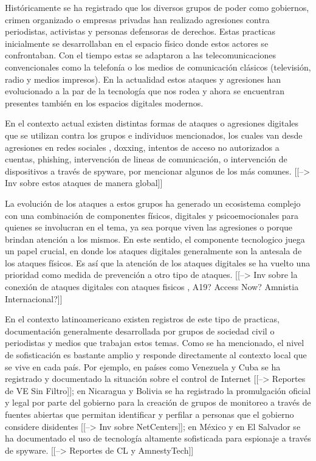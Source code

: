 \documentclass[12pt]{caltech_thesis}
\begin{document}
Históricamente se ha registrado que los diversos grupos de poder como gobiernos, crimen organizado o empresas privadas han realizado agresiones contra periodistas, activistas y personas defensoras de derechos. Estas practicas inicialmente se desarrollaban en el espacio físico donde estos actores se confrontaban. Con el tiempo estas se adaptaron a las telecomunicaciones convencionales como la telefonía o los medios de comunicación clásicos (televisión, radio y medios impresos). En la actualidad estos ataques y agresiones han evolucionado a la par de la tecnología que nos rodea y ahora se encuentran presentes también en los espacios digitales modernos.

En el contexto actual existen distintas formas de ataques o agresiones digitales que se utilizan contra los grupos e individuos mencionados, los cuales van desde agresiones en redes sociales , doxxing, intentos de acceso no autorizados a cuentas, phishing, intervención de lineas de comunicación, o intervención de dispositivos a través de spyware, por mencionar algunos de los más comunes. [[--> Inv sobre estos ataques de manera global]]

La evolución de los ataques a estos grupos ha generado un ecosistema complejo con una combinación de componentes físicos, digitales y psicoemocionales para quienes se involucran en el tema, ya sea porque viven las agresiones o porque brindan atención a los mismos. En este sentido, el componente tecnologico juega un papel crucial, en donde los ataques digitales generalmente son la antesala de los ataques físicos. Es así que la atención de los ataques digitales se ha vuelto una prioridad como medida de prevención a otro tipo de ataques. [[--> Inv sobre la conexión de ataques digitales con ataques fisicos , A19? Access Now? Amnistia Internacional?]]

En el contexto latinoamericano existen registros de este tipo de practicas, documentación generalmente desarrollada por grupos de sociedad civil o periodistas y medios que trabajan estos temas. Como se ha mencionado, el nivel de sofisticación es bastante amplio y responde directamente al contexto local que se vive en cada país. Por ejemplo, en países como Venezuela y Cuba se ha registrado y documentado la situación sobre el control de Internet [[--> Reportes de VE Sin Filtro]]; en Nicaragua y Bolivia se ha registrado la promulgación oficial y legal por parte del gobierno para la creación de grupos de monitoreo a través de fuentes abiertas que permitan identificar y perfilar a personas que el gobierno considere disidentes [[--> Inv sobre NetCenters]]; en México y en El Salvador se ha documentado el uso de tecnología altamente sofisticada para espionaje a través de spyware. [[--> Reportes de CL y AmnestyTech]]
\end{document}
